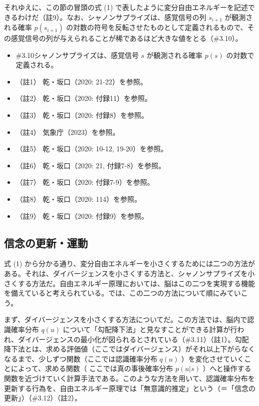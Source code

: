 それゆえに、この節の冒頭の式 (1)
で表したように変分自由エネルギーを記述できるわけだ（註9）。なお、シャノンサプライズは、感覚信号の列
\(s_{i+1}\) が観測される確率 \(p(s_{i+1})\)
の対数の符号を反転させたものとして定義されるもので、その感覚信号の列が与えられることが稀であるほど大きな値をとる（\#3.10）。

\begin{note}{}
  \begin{itemize}
    \tightlist
    \item{\#3.10}シャノンサプライズは、感覚信号 $s$ が観測される確率 $p(s)$ の対数で定義される。
  \end{itemize}
\end{note}

\begin{itemize}
\tightlist
\item
  （註1） 乾・坂口（2020: 21-22）\cite{InuiAndSakaguchi}を参照。
\item
  （註2） 乾・坂口（2020: 付録11）\cite{InuiAndSakaguchi}を参照。
\item
  （註3） 乾・坂口（2020: 付録8）\cite{InuiAndSakaguchi}を参照。
\item
  （註4） 気象庁（2023）\cite{JMA}を参照。
\item
  （註5） 乾・坂口（2020: 10-12, 19-20）\cite{InuiAndSakaguchi}を参照。
\item
  （註6） 乾・坂口（2020: 21, 付録7-8）\cite{InuiAndSakaguchi}を参照。
\item
  （註7） 乾・坂口（2020: 付録7-9）\cite{InuiAndSakaguchi}を参照。
\item
  （註8） 乾・坂口（2020: 114）\cite{InuiAndSakaguchi}を参照。
\item
  （註9） 乾・坂口（2020: 付録9）\cite{InuiAndSakaguchi}を参照。
\end{itemize}

\subsection{信念の更新・運動}\label{ux4fe1ux5ff5ux306eux66f4ux65b0ux904bux52d5}

式 (1)
から分かる通り、変分自由エネルギーを小さくするためには二つの方法がある。それは、ダイバージェンスを小さくする方法と、シャノンサプライズを小さくする方法だ。自由エネルギー原理においては、脳はこの二つを実現する機能を備えていると考えられている。では、この二つの方法について順にみていこう。

まず、ダイバージェンスを小さくする方法についてだ。この方法では、脳内で認識確率分布
\(q(u)\)
について「勾配降下法」と見なすことができる計算が行われ、ダイバージェンスの最小化が図られるとされている（\#3.11）（註1）。勾配降下法とは、求める評価値（ここではダイバージェンス）がそれ以上下がらなくなるまで、少しずつ関数（ここでは認識確率分布
\(q(u)\) ）を変化させていくことによって、求める関数（
ここでは真の事後確率分布 \(p(u|s)\)
）へと操作する関数を近づけていく計算手法である。このような方法を用いて、認識確率分布を更新する行為を、自由エネルギー原理では「無意識的推定」という（＝「信念の更新」）（\#3.12）（註2）。

